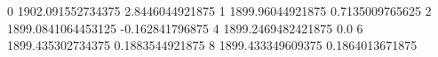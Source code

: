 0 1902.091552734375 2.8446044921875
1 1899.96044921875 0.7135009765625
2 1899.0841064453125 -0.162841796875
4 1899.2469482421875 0.0
6 1899.435302734375 0.1883544921875
8 1899.433349609375 0.1864013671875
